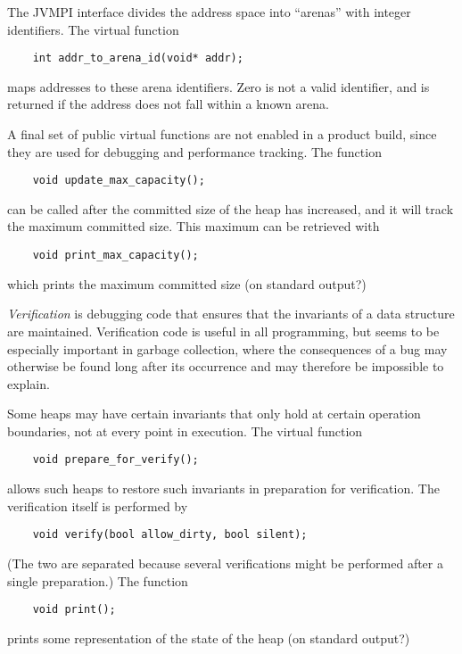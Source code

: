 \documentclass{article}
\begin{document}
The JVMPI interface divides the address space into ``arenas'' with
integer identifiers.  The virtual function
\begin{verbatim}
    int addr_to_arena_id(void* addr);
\end{verbatim}
maps addresses to these arena identifiers.  Zero is not a valid
identifier, and is returned if the address does not fall within a
known arena.  

A final set of public virtual functions are not enabled in a product
build, since they are used for debugging and performance tracking.
The function
\begin{verbatim}
    void update_max_capacity();
\end{verbatim}
can be called after the committed size of the heap has increased, and
it will track the maximum committed size.  This maximum can be
retrieved with
\begin{verbatim}
    void print_max_capacity();
\end{verbatim}
which prints the maximum committed size (on standard output?)

{\em Verification} is debugging code that ensures that the invariants
of a data structure are maintained.  Verification code is useful in
all programming, but seems to be especially important in garbage
collection, where the consequences of a bug may otherwise be found
long after its occurrence and may therefore be impossible to explain.

Some heaps may have certain invariants that only hold at certain
operation boundaries, not at every point in execution.  The virtual
function
\begin{verbatim}
    void prepare_for_verify();
\end{verbatim}
allows such heaps to restore such invariants in preparation for
verification.  The verification itself is performed by
\begin{verbatim}
    void verify(bool allow_dirty, bool silent);
\end{verbatim}
(The two are separated because several verifications might be
performed after a single preparation.)  
The function
\begin{verbatim}
    void print();
\end{verbatim}
prints some representation of the state of the heap (on standard output?)

\end{document}
